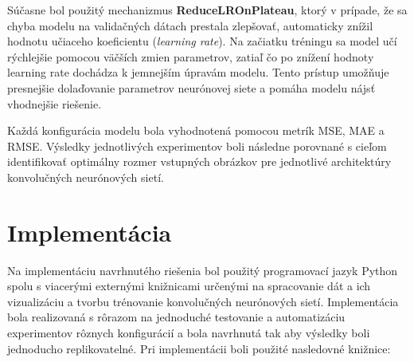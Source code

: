 Súčasne bol použitý mechanizmus \textbf{ReduceLROnPlateau}, ktorý v prípade, že sa chyba modelu na validačných dátach 
prestala zlepšovať, automaticky znížil hodnotu učiaceho koeficientu (\textit{learning rate}). Na začiatku tréningu 
sa model učí rýchlejšie pomocou väčších zmien parametrov, zatiaľ čo po znížení hodnoty learning rate dochádza k 
jemnejším úpravám modelu. Tento prístup umožňuje presnejšie dolaďovanie parametrov neurónovej siete a pomáha modelu 
nájsť vhodnejšie riešenie.

Každá konfigurácia modelu bola vyhodnotená pomocou metrík MSE, MAE a RMSE. 
Výsledky jednotlivých experimentov boli následne porovnané s cieľom identifikovať optimálny rozmer 
vstupných obrázkov pre jednotlivé architektúry konvolučných neurónových sietí.





\section{Implementácia}
Na implementáciu navrhnutého riešenia bol použitý programovací jazyk Python \cite{learningPython} 
spolu s viacerými externými knižnicami určenými na spracovanie dát a ich vizualizáciu a tvorbu trénovanie 
konvolučných neurónových sietí. Implementácia bola realizovaná s rôrazom na jednoduché testovanie a automatizáciu experimentov rôznych konfigurácií a bola navrhnutá tak aby výsledky boli jednoducho replikovatelné. 
Pri implementácii boli použité nasledovné knižnice:

